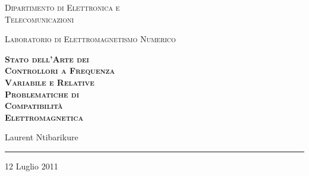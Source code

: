 \thispagestyle{empty}
\begin{center}
\vspace*{2cm}

{\LARGE \scshape Dipartimento di Elettronica e\\Telecomunicazioni}

\vspace{0.5cm}

{\Large \scshape Laboratorio di Elettromagnetismo Numerico}

\vspace{2.5cm}

{\huge\bfseries\scshape\color{mycolor} Stato dell'Arte dei\\Controllori a Frequenza\\Variabile e Relative\\Problematiche di\\Compatibilità\\Elettromagnetica}

\vspace{2.5cm}

{\Large Laurent Ntibarikure}

\vspace{1.5cm}

\rule{0.4\textwidth}{0.4pt}

\vspace{1cm}

{\large 12 Luglio 2011}

\end{center}
